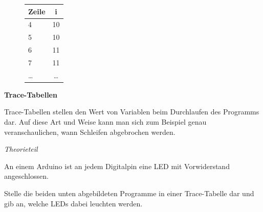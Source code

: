 \documentclass[ngerman, 11pt]{scrreprt}
\begin{document}
	
	\begin{figure}
		\centering
		\begin{tabular}{l | c}
			\textbf{Zeile} & \textbf{i} \\ \hline
			4 & 10 \\ \hline
			5 & 10 \\ \hline
			6 & 11 \\ \hline
			7 & 11 \\ \hline
			\dots & \dots \\ \hline
		\end{tabular}
	\end{figure}
	\textbf{Trace-Tabellen}
	
	Trace-Tabellen stellen den Wert von Variablen beim Durchlaufen des Programms dar. Auf diese Art und Weise kann man sich zum Beispiel genau veranschaulichen, wann Schleifen abgebrochen werden.
	
	
	\begin{aufgabe*} \emph{Theorieteil}
		
		An einem Arduino ist an jedem Digitalpin eine LED mit Vorwiderstand angeschlossen.
		
		Stelle die beiden unten abgebildeten Programme in einer Trace-Tabelle dar und gib an, welche LEDs dabei leuchten werden.
	\end{aufgabe*}
	
\end{document}
